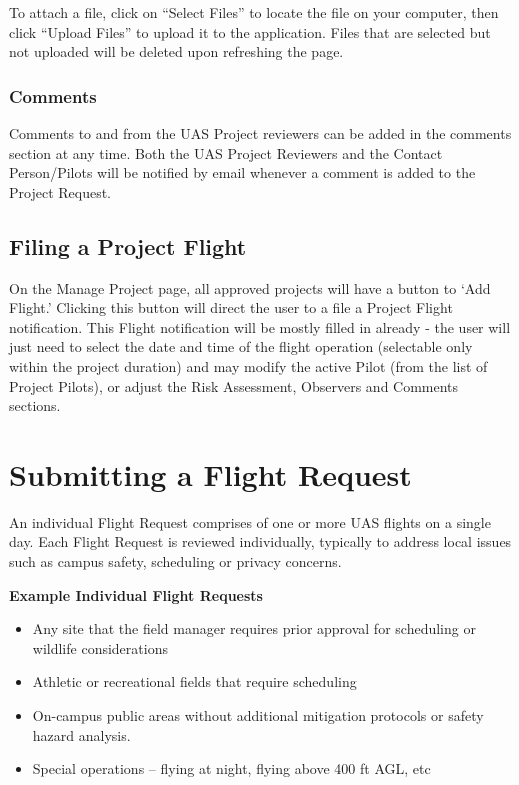 \documentclass[
]{book}
\providecommand{\tightlist}{%
  \setlength{\itemsep}{0pt}\setlength{\parskip}{0pt}}
\begin{document}
To attach a file, click on ``Select Files'' to locate the file on your computer, then click ``Upload Files'' to upload it to the application. Files that are selected but not uploaded will be deleted upon refreshing the page.

\hypertarget{comments}{%
\subsection{Comments}\label{comments}}

Comments to and from the UAS Project reviewers can be added in the comments section at any time. Both the UAS Project Reviewers and the Contact Person/Pilots will be notified by email whenever a comment is added to the Project Request.

\hypertarget{filing-a-project-flight}{%
\section{Filing a Project Flight}\label{filing-a-project-flight}}

On the Manage Project page, all approved projects will have a button to `Add Flight.' Clicking this button will direct the user to a file a Project Flight notification. This Flight notification will be mostly filled in already - the user will just need to select the date and time of the flight operation (selectable only within the project duration) and may modify the active Pilot (from the list of Project Pilots), or adjust the Risk Assessment, Observers and Comments sections.

\hypertarget{submitting-a-flight-request}{%
\chapter{Submitting a Flight Request}\label{submitting-a-flight-request}}

An individual Flight Request comprises of one or more UAS flights on a single day. Each Flight Request is reviewed individually, typically to address local issues such as campus safety, scheduling or privacy concerns.

\textbf{Example Individual Flight Requests}

\begin{itemize}
\tightlist
\item
  Any site that the field manager requires prior approval for scheduling or wildlife considerations
\item
  Athletic or recreational fields that require scheduling
\item
  On-campus public areas without additional mitigation protocols or safety hazard analysis.
\item
  Special operations -- flying at night, flying above 400 ft AGL, etc
\end{itemize}
\end{document}
